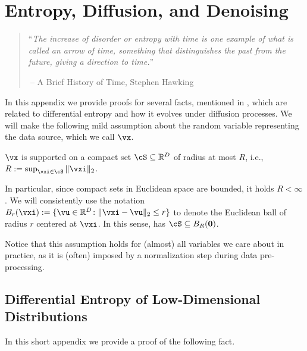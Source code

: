 \documentclass[../../book-main.tex]{subfiles}
\begin{document}
\chapter{Entropy, Diffusion, and Denoising}\label{app:entropy}\label{app:diffusion-denoising}

\begin{quote}
``{\em The increase of disorder or entropy with time is one example of what is called an arrow of time, something that distinguishes the past from the future, giving a direction to time.}''

$~$\hfill -- A Brief History of Time, Stephen Hawking
 \end{quote}
\vspace{5mm}

In this appendix we provide proofs for several facts, mentioned in , which are related to differential entropy and how it evolves under diffusion processes. We will make the following mild assumption about the random variable representing the data source, which we call \(\vx\).

\begin{assumption}\label{assumption:entropy_x_compact_support}
    \(\vx\) is supported on a compact set \(\cS \subseteq \R^{D}\) of radius at most \(R\), i.e., \(R := \sup_{\vxi \in \cS}\norm{\vxi}_{2}\).
\end{assumption}

In particular, since compact sets in Euclidean space are bounded, it holds \(R < \infty\). We will consistently use the notation \(B_{r}(\vxi) := \{\vu \in \R^{D} \colon \norm{\vxi - \vu}_{2} \leq r\}\) to denote the Euclidean ball of radius \(r\) centered at \(\vxi\). In this sense,  has \(\cS \subseteq B_{R}(\vzero)\).

Notice that this assumption holds for (almost) all variables we care about in practice, as it is (often) imposed by a normalization step during data pre-processing. 

\section{Differential Entropy of Low-Dimensional Distributions}\label{sec:low_dim_entropy}

In this short appendix we provide a proof of the following fact.
\end{document}
